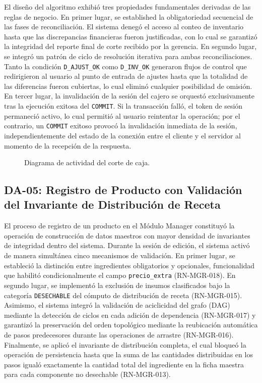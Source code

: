 El diseño del algoritmo exhibió tres propiedades fundamentales derivadas de las reglas de negocio. En primer lugar, se established la obligatoriedad secuencial de las fases de reconciliación. El sistema denegó el acceso al conteo de inventario hasta que las discrepancias financieras fueron justificadas, con lo cual se garantizó la integridad del reporte final de corte recibido por la gerencia. En segundo lugar, se integró un patrón de ciclo de resolución iterativa para ambas reconciliaciones. Tanto la condición \texttt{D\_AJUST\_OK} como \texttt{D\_INV\_OK} generaron flujos de control que redirigieron al usuario al punto de entrada de ajustes hasta que la totalidad de las diferencias fueron cubiertas, lo cual eliminó cualquier posibilidad de omisión. En tercer lugar, la invalidación de la sesión del cajero se orquestó exclusivamente tras la ejecución exitosa del \texttt{COMMIT}. Si la transacción falló, el token de sesión permaneció activo, lo cual permitió al usuario reintentar la operación; por el contrario, un \texttt{COMMIT} exitoso provocó la invalidación inmediata de la sesión, independientemente del estado de la conexión entre el cliente y el servidor al momento de la recepción de la respuesta.

\begin{figure}[H]
    \centering
    
    \caption{Diagrama de actividad del corte de caja.}
    \label{fig:diagrama-actividad-corte-caja}
\end{figure}

\subsection{DA-05: Registro de Producto con Validación del Invariante de Distribución de Receta}

El proceso de registro de un producto en el Módulo Manager constituyó la operación de construcción de datos maestros con mayor densidad de invariantes de integridad dentro del sistema. Durante la sesión de edición, el sistema activó de manera simultánea cinco mecanismos de validación. En primer lugar, se estableció la distinción entre ingredientes obligatorios y opcionales, funcionalidad que habilitó condicionalmente el campo \texttt{precio\_extra} (RN-MGR-018). En segundo lugar, se implementó la exclusión de insumos clasificados bajo la categoría \texttt{DESECHABLE} del cómputo de distribución de receta (RN-MGR-015). Asimismo, el sistema integró la validación de aciclicidad del grafo (DAG) mediante la detección de ciclos en cada adición de dependencia (RN-MGR-017) y garantizó la preservación del orden topológico mediante la reubicación automática de pasos predecesores durante las operaciones de arrastre (RN-MGR-016). Finalmente, se aplicó el invariante de distribución completa, el cual bloqueó la operación de persistencia hasta que la suma de las cantidades distribuidas en los pasos igualó exactamente la cantidad total del ingrediente en la ficha maestra para cada componente no desechable (RN-MGR-013).

